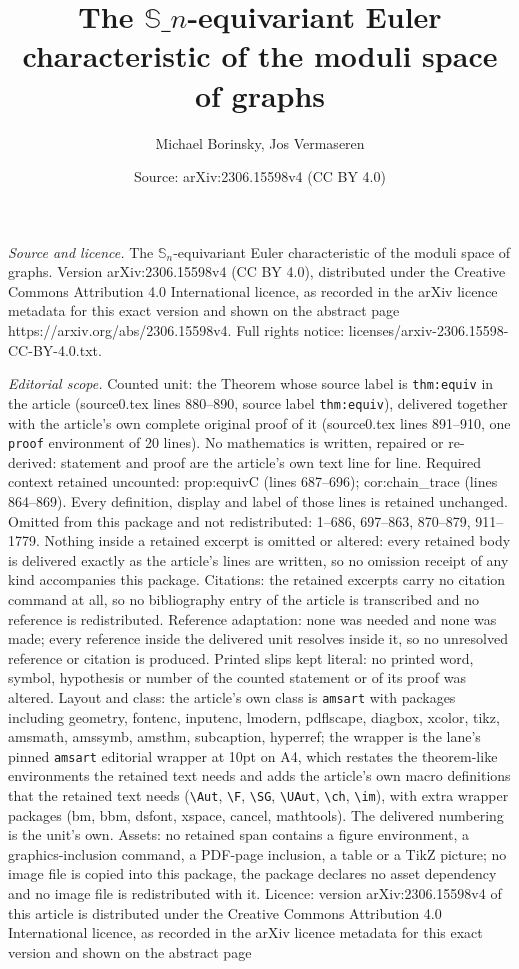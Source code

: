 \documentclass[10pt,a4paper]{amsart}
\title[The ${\mathbb S}\_n$-equivariant Euler characteristic of the ]{The ${\mathbb S}\_n$-equivariant Euler characteristic of the moduli space of graphs}
\author{Michael Borinsky, Jos Vermaseren}
\date{Source: arXiv:2306.15598v4 (CC BY 4.0)}
\begin{document}
\maketitle

\noindent\emph{Source and licence.} The ${\mathbb S}_n$-equivariant Euler characteristic of the moduli space of graphs. Version arXiv:2306.15598v4 (CC BY 4.0), distributed under the Creative Commons Attribution 4.0 International licence, as recorded in the arXiv licence metadata for this exact version and shown on the abstract page https://arxiv.org/abs/2306.15598v4. Full rights notice: licenses/arxiv-2306.15598-CC-BY-4.0.txt.\par\smallskip

\noindent\textit{Editorial scope.} Counted unit: the Theorem whose source label is \texttt{thm:equiv} in the article (source0.tex lines 880--890, source label \texttt{thm:equiv}), delivered together with the article's own complete original proof of it (source0.tex lines 891--910, one \texttt{proof} environment of 20 lines). No mathematics is written, repaired or re-derived: statement and proof are the article's own text line for line. Required context retained uncounted: prop:equivC (lines 687--696); cor:chain\_trace (lines 864--869). Every definition, display and label of those lines is retained unchanged. Omitted from this package and not redistributed: 1--686, 697--863, 870--879, 911--1779. Nothing inside a retained excerpt is omitted or altered: every retained body is delivered exactly as the article's lines are written, so no omission receipt of any kind accompanies this package. Citations: the retained excerpts carry no citation command at all, so no bibliography entry of the article is transcribed and no reference is redistributed. Reference adaptation: none was needed and none was made; every reference inside the delivered unit resolves inside it, so no unresolved reference or citation is produced. Printed slips kept literal: no printed word, symbol, hypothesis or number of the counted statement or of its proof was altered. Layout and class: the article's own class is \texttt{amsart} with packages including geometry, fontenc, inputenc, lmodern, pdflscape, diagbox, xcolor, tikz, amsmath, amssymb, amsthm, subcaption, hyperref; the wrapper is the lane's pinned \texttt{amsart} editorial wrapper at 10pt on A4, which restates the theorem-like environments the retained text needs and adds the article's own macro definitions that the retained text needs (\texttt{\textbackslash Aut}, \texttt{\textbackslash F}, \texttt{\textbackslash SG}, \texttt{\textbackslash UAut}, \texttt{\textbackslash ch}, \texttt{\textbackslash im}), with extra wrapper packages (bm, bbm, dsfont, xspace, cancel, mathtools). The delivered numbering is the unit's own. Assets: no retained span contains a figure environment, a graphics-inclusion command, a PDF-page inclusion, a table or a TikZ picture; no image file is copied into this package, the package declares no asset dependency and no image file is redistributed with it. Licence: version arXiv:2306.15598v4 of this article is distributed under the Creative Commons Attribution 4.0 International licence, as recorded in the arXiv licence metadata for this exact version and shown on the abstract page 
\end{document}
